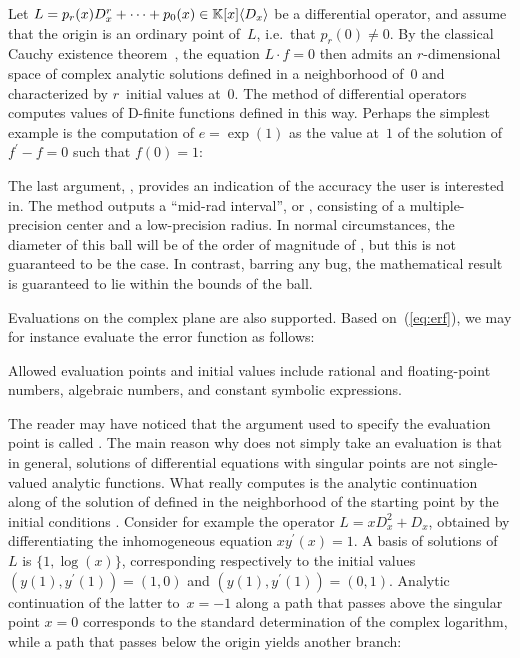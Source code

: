 \documentclass[runningheads,a4paper]{llncs}
\begin{document}
Let $L = p_r (x) D_x^r + \cdots + p_0 (x) \in \mathbbm{K} [x] \langle D_x
\rangle$ be a differential operator, and assume that the origin is an ordinary
point of~$L$, i.e.\ that $p_r (0) \neq 0$. By the classical Cauchy existence
theorem~\cite{Hille1976}, the equation $L \cdot f = 0$ then admits an $r$\mbox{-}dimensional
space of complex analytic solutions defined in a neighborhood of~$0$ and
characterized by $r$~initial values at~$0$. The
 method of differential operators computes
values of D-finite functions defined in this way. Perhaps the simplest example
is the computation of $e = \exp (1)$ as the value at~$1$ of the solution of
$f^{\prime} - f = 0$ such that $f (0) = 1$:


{\noindent}The last argument, , provides an indication of the
accuracy the user is interested in. The method outputs a ``mid-rad interval'',
or {}, consisting of a multiple-precision center and a
low-precision radius. In normal circumstances, the diameter of this ball will
be of the order of magnitude of , but this is not guaranteed to
be the case. In contrast, barring any bug, the mathematical result is
guaranteed to lie within the bounds of the ball.

Evaluations on the complex plane are also supported. Based on~(\ref{eq:erf}),
we may for instance evaluate the error function as follows:
\enlargethispage{\baselineskip}


{\noindent}Allowed evaluation points and initial values include rational and
floating-point numbers, algebraic numbers, and constant symbolic expressions.

The reader may have noticed that the argument used to specify the evaluation
point is called {}. The main reason why
 does not simply take an evaluation
{} is that in general, solutions of differential equations with
singular points are not single-valued analytic functions. What
 really computes is the
analytic continuation along  of the solution of
 defined in the neighborhood of the starting point by the
initial conditions . Consider for example the operator $L = xD_x^2
+ D_x$, obtained by differentiating the inhomogeneous equation $xy^{\prime}
(x) = 1$. A basis of solutions of~$L$ is $\{ 1, \log (x) \}$, corresponding
respectively to the initial values $(y (1), y^{\prime} (1)) = (1, 0)$ and $(y
(1), y^{\prime} (1)) = (0, 1)$. Analytic continuation of the latter to~$x=-1$ along a
path that passes above the singular point $x = 0$ corresponds to the standard
determination of the complex logarithm, while a path that passes below the
origin yields another branch:
\end{document}
